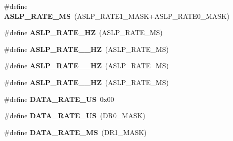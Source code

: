 \begin{DoxyCompactItemize}
\item 
\hypertarget{group___engduino_accelerometer_ga91905c9fa58df6dc8ac41495fc52fa9c}{}\#define {\bfseries A\+S\+L\+P\+\_\+\+R\+A\+T\+E\+\_\+M\+S}~(A\+S\+L\+P\+\_\+\+R\+A\+T\+E1\+\_\+\+M\+A\+S\+K+A\+S\+L\+P\+\_\+\+R\+A\+T\+E0\+\_\+\+M\+A\+S\+K)\label{group___engduino_accelerometer_ga91905c9fa58df6dc8ac41495fc52fa9c}

\item 
\hypertarget{group___engduino_accelerometer_ga96490761b0e13c66850b7ef29a296782}{}\#define {\bfseries A\+S\+L\+P\+\_\+\+R\+A\+T\+E\+\_\+H\+Z}~(A\+S\+L\+P\+\_\+\+R\+A\+T\+E\+\_\+M\+S)\label{group___engduino_accelerometer_ga96490761b0e13c66850b7ef29a296782}

\item 
\hypertarget{group___engduino_accelerometer_ga47931dda27ef1bc8fb2bdeb5bab80cd1}{}\#define {\bfseries A\+S\+L\+P\+\_\+\+R\+A\+T\+E\+\_\+\_\+H\+Z}~(A\+S\+L\+P\+\_\+\+R\+A\+T\+E\+\_\+M\+S)\label{group___engduino_accelerometer_ga47931dda27ef1bc8fb2bdeb5bab80cd1}

\item 
\hypertarget{group___engduino_accelerometer_ga215ad60cb9f1734960280a607c9cc391}{}\#define {\bfseries A\+S\+L\+P\+\_\+\+R\+A\+T\+E\+\_\+\_\+H\+Z}~(A\+S\+L\+P\+\_\+\+R\+A\+T\+E\+\_\+M\+S)\label{group___engduino_accelerometer_ga215ad60cb9f1734960280a607c9cc391}

\item 
\hypertarget{group___engduino_accelerometer_ga2e3e5259538a904d9e17b0dab32b568c}{}\#define {\bfseries A\+S\+L\+P\+\_\+\+R\+A\+T\+E\+\_\+\_\+H\+Z}~(A\+S\+L\+P\+\_\+\+R\+A\+T\+E\+\_\+M\+S)\label{group___engduino_accelerometer_ga2e3e5259538a904d9e17b0dab32b568c}

\item 
\hypertarget{group___engduino_accelerometer_ga6cb25d40c008fa256ddc735c69daf0f8}{}\#define {\bfseries D\+A\+T\+A\+\_\+\+R\+A\+T\+E\+\_\+U\+S}~0x00\label{group___engduino_accelerometer_ga6cb25d40c008fa256ddc735c69daf0f8}

\item 
\hypertarget{group___engduino_accelerometer_ga5c0c8a714527e762acf761d5fa6c328e}{}\#define {\bfseries D\+A\+T\+A\+\_\+\+R\+A\+T\+E\+\_\+U\+S}~(D\+R0\+\_\+\+M\+A\+S\+K)\label{group___engduino_accelerometer_ga5c0c8a714527e762acf761d5fa6c328e}

\item 
\hypertarget{group___engduino_accelerometer_gafcee389028164359d0ae99d2ebdc975a}{}\#define {\bfseries D\+A\+T\+A\+\_\+\+R\+A\+T\+E\+\_\+M\+S}~(D\+R1\+\_\+\+M\+A\+S\+K)\label{group___engduino_accelerometer_gafcee389028164359d0ae99d2ebdc975a}


\end{DoxyCompactItemize}
